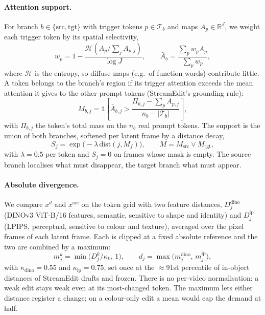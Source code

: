 \documentclass[10pt,twocolumn]{article}
\newcommand{\src}{\mathrm{src}}
\newcommand{\tgt}{\mathrm{tgt}}
\begin{document}
\paragraph{Attention support.}
For branch $b\in\{\src,\tgt\}$ with trigger tokens $p\in\mathcal{T}_b$ and maps $A_p\in\mathbb{R}^{J}$, we weight each trigger token by its spatial selectivity,
\begin{equation}
w_p = 1 - \frac{\mathcal{H}\!\left(A_p/\textstyle\sum_{j}A_{p,j}\right)}{\log J},\qquad
\bar A_b = \frac{\sum_{p} w_p A_p}{\sum_p w_p},
\end{equation}
where $\mathcal{H}$ is the entropy, so diffuse maps (e.g.\ of function words) contribute little. A token belongs to the branch's region if its trigger attention exceeds the mean attention it gives to the other prompt tokens (StreamEdit's grounding rule):
\begin{equation}
M_{b,j} = \mathbb{1}\!\left[\bar A_{b,j} > \frac{\Pi_{b,j}-\sum_{p}A_{p,j}}{n_b - |\mathcal{T}_b|}\right],
\end{equation}
with $\Pi_{b,j}$ the token's total mass on the $n_b$ real prompt tokens. The support is the union of both branches, softened per latent frame by a distance decay,
\begin{equation}
S_j = \exp\!\big(-\lambda\,\mathrm{dist}(j, M_f)\big),\qquad M = M_{\src}\lor M_{\tgt},
\end{equation}
with $\lambda=0.5$ per token and $S_j=0$ on frames whose mask is empty. The source branch localises what must disappear, the target branch what must appear.

\paragraph{Absolute divergence.}
We compare $x^{d}$ and $x^{\src}$ on the token grid with two feature distances, $D^{\mathrm{dino}}_j$ (DINOv3 ViT-B/16 features, semantic, sensitive to shape and identity) and $D^{\mathrm{lp}}_j$ (LPIPS, perceptual, sensitive to colour and texture), averaged over the pixel frames of each latent frame. Each is clipped at a fixed absolute reference and the two are combined by a maximum:
\begin{equation}
m^{k}_j = \min\!\big(D^{k}_j/\kappa_k,\,1\big),\qquad d_j = \max\big(m^{\mathrm{dino}}_j,\, m^{\mathrm{lp}}_j\big),
\end{equation}
with $\kappa_{\mathrm{dino}}=0.55$ and $\kappa_{\mathrm{lp}}=0.75$, set once at the $\approx$91st percentile of in-object distances of StreamEdit drafts and frozen. There is no per-video normalisation: a weak edit stays weak even at its most-changed token. The maximum lets either distance register a change; on a colour-only edit a mean would cap the demand at half.
\end{document}
